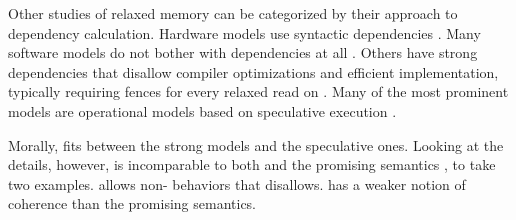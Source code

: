 Other studies of relaxed memory can be categorized by their approach to
dependency calculation.  Hardware models use syntactic dependencies
\cite{alglave}.  Many software models do not bother with dependencies at all
\cite{Batty:2011:MCC:1926385.1926394, DBLP:journals/pacmpl/WattRP19,
  DBLP:conf/pldi/WattPPBDFPG20, goMM}.  Others have strong dependencies that
disallow compiler optimizations and efficient implementation, typically
requiring fences for every relaxed read on \armeight{}
\cite{Lamport:1979:MMC:1311099.1311750, DBLP:conf/pldi/LahavVKHD17,
  Dolan:2018:BDR:3192366.3192421, DBLP:conf/lics/JeffreyR16,
  Boehm:2014:OGA:2618128.2618134}. %
%
Many of the most prominent models are operational models based on speculative
execution \cite{Manson:2005:JMM:1047659.1040336,
  DBLP:conf/esop/JagadeesanPR10,
  DBLP:conf/popl/KangHLVD17,DBLP:journals/pacmpl/ChakrabortyV19,DBLP:conf/pldi/LeeCPCHLV20,promising-ldrf}.

Morally, \PwT{} fits between the strong models and the speculative ones.
Looking at the details, however, \PwTmca{} is incomparable to both \rcXI{}
\cite{DBLP:conf/pldi/LahavVKHD17} and the promising semantics
\cite{DBLP:conf/popl/KangHLVD17}, to take two examples.  \rcXI{} allows
non-\mca{} behaviors that \PwTmca{} disallows.  \PwTmca{} has a weaker notion
of coherence than the promising semantics.



